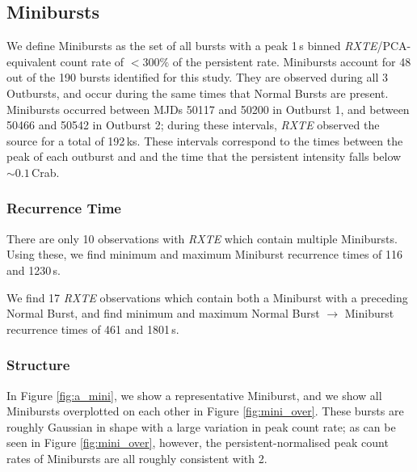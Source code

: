 \subsection{Minibursts}

\par We define Minibursts as the set of all bursts with a peak 1\,s binned \textit{RXTE}/PCA-equivalent count rate of $<300\%$ of the persistent rate.  Minibursts account for 48 out of the 190 bursts identified for this study.  They are observed during all 3 Outbursts, and occur during the same times that Normal Bursts are present.  Minibursts occurred between MJDs 50117 and 50200 in Outburst 1, and between 50466 and 50542 in Outburst 2; during these intervals, \textit{RXTE} observed the source for a total of 192\,ks.  These intervals correspond to the times between the peak of each outburst and and the time that the persistent intensity falls below $\sim0.1$\,Crab.

\subsubsection{Recurrence Time}

\par There are only 10 observations with \textit{RXTE} which contain multiple Minibursts.  Using these, we find minimum and maximum Miniburst recurrence times of 116 and 1230\,s.
\par We find 17 \textit{RXTE} observations which contain both a Miniburst with a preceding Normal Burst, and find minimum and maximum Normal Burst $\rightarrow$ Miniburst recurrence times of 461 and 1801\,s.

\subsubsection{Structure}

\par In Figure \ref{fig:a_mini}, we show a representative Miniburst, and we show all Minibursts overplotted on each other in Figure \ref{fig:mini_over}.  These bursts are roughly Gaussian in shape with a large variation in peak count rate; as can be seen in Figure \ref{fig:mini_over}, however, the persistent-normalised peak count rates of Minibursts are all roughly consistent with 2.

